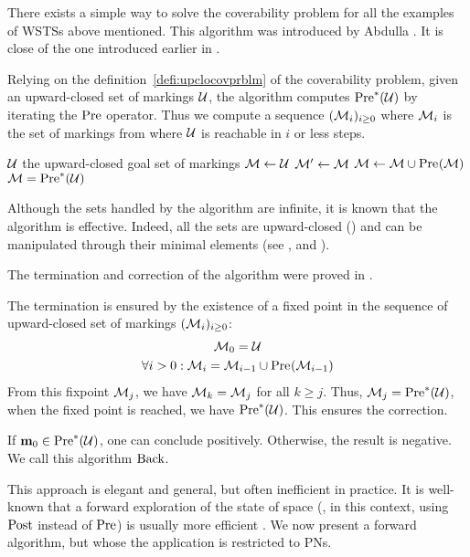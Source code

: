 There exists a simple way to solve the coverability problem for all the examples of \acp{WSTS} above mentioned.
This algorithm was introduced by Abdulla  \citep{Abdulla96}.
It is close of the one introduced earlier in \cite{Finkel90}.

Relying on the definition~\ref{defi:upclocovprblm} of the coverability problem, given an upward-closed set of markings $\mathcal{U}$, the algorithm computes $\operatorname{Pre}^*_{}(\mathcal{U})$ by iterating the $\operatorname{Pre}$ operator.
Thus we compute a sequence $(\mathcal{M}_i)_{i \geq 0}$ where $\mathcal{M}_i$ is the set of markings from where $\mathcal{U}$ is reachable in $i$ or less steps.


\begin{algorithm}
  \caption{$\back$}
  \label{algo:back}

  \begin{algorithmic}
    \Require $\mathcal{U}$ the upward-closed goal set of markings
    \State $\mathcal{M} \gets \mathcal{U}$
    \Repeat
      \State $\mathcal{M}'\gets \mathcal{M}$
      \State $\mathcal{M} \gets \mathcal{M} \cup \operatorname{Pre}_{}(\mathcal{M})$
    \Ensure $\mathcal{M} = \operatorname{Pre}^*_{}(\mathcal{U})$
  \end{algorithmic}
\end{algorithm}


Although the sets handled by the algorithm are infinite, it is known that the algorithm is effective.
Indeed, all the sets are upward-closed () and can be manipulated through their minimal elements (see , and \cite{Ganty09, valk1985residue}).

The termination and correction of the algorithm were proved in \cite{Abdulla96}.%


The termination is ensured by the existence of a fixed point in the sequence of upward-closed set of markings $(\mathcal{M}_i)_{i \geq 0}$:
\begin{gather*}
  \mathcal{M}_0 = \mathcal{U} \\
  \forall i > 0 : \mathcal{M}_i = \mathcal{M}_{i-1} \cup \operatorname{Pre}_{}(\mathcal{M}_{i-1})
\end{gather*}
From this fixpoint $\mathcal{M}_j$, we have $\mathcal{M}_k = \mathcal{M}_j$ for all $k \geq j$.
Thus, $\mathcal{M}_j = \operatorname{Pre}^*_{}(\mathcal{U})$, \ie when the fixed point is reached, we have $\operatorname{Pre}^*_{}(\mathcal{U})$.
This ensures the correction.

If $\mathbf{m}_0 \in \operatorname{Pre}^*_{}(\mathcal{U})$, one can conclude positively.
Otherwise, the result is negative.
We call this algorithm $\back$.

This approach is elegant and general, but often inefficient in practice.
It is well-known that a forward exploration of the state of space (\ie, in this context, using $\operatorname{Post}$ instead of $\operatorname{Pre}$) is usually more efficient \citep{Henzinger98}.
We now present a forward algorithm, but whose the application is restricted to \acp{PN}.
